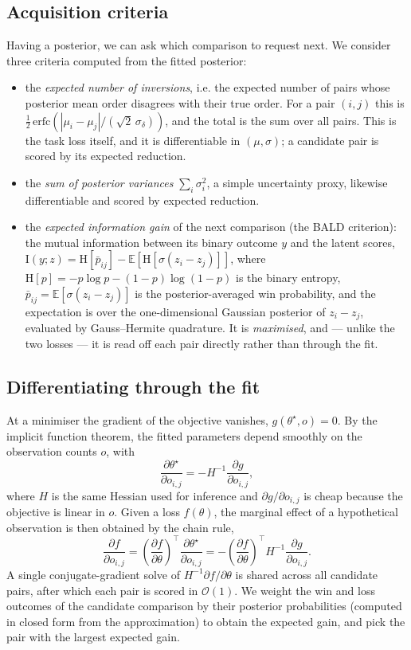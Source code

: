 \documentclass[12pt]{article}
\begin{document}
\subsection{Acquisition criteria}
Having a posterior, we can ask which comparison to request next. We consider three criteria computed
from the fitted posterior:
\begin{itemize}
    \item the \emph{expected number of inversions}, i.e. the expected number of pairs whose
          posterior mean order disagrees with their true order. For a pair $(i,j)$ this is
          $\tfrac{1}{2}\,\mathrm{erfc}\!\left(|\mu_i - \mu_j| / (\sqrt{2}\,\sigma_\delta)\right)$,
          and the total is the sum over all pairs. This is the task loss itself, and it is
          differentiable in $(\mu, \sigma)$; a candidate pair is scored by its expected reduction.
    \item the \emph{sum of posterior variances} $\sum_i \sigma_i^2$, a simple uncertainty proxy,
          likewise differentiable and scored by expected reduction.
    \item the \emph{expected information gain} of the next comparison (the BALD criterion): the mutual
          information between its binary outcome $y$ and the latent scores,
          $\mathrm{I}(y; z) = \mathrm{H}[\bar p_{ij}] - \mathbb{E}\!\left[\mathrm{H}[\sigma(z_i - z_j)]\right]$,
          where $\mathrm{H}[p] = -p\log p - (1-p)\log(1-p)$ is the binary entropy,
          $\bar p_{ij} = \mathbb{E}[\sigma(z_i - z_j)]$ is the posterior-averaged win probability, and the
          expectation is over the one-dimensional Gaussian posterior of $z_i - z_j$, evaluated by
          Gauss--Hermite quadrature. It is \emph{maximised}, and --- unlike the two losses --- it is
          read off each pair directly rather than through the fit.
\end{itemize}

\subsection{Differentiating through the fit}
At a minimiser the gradient of the objective vanishes, $g(\theta^\star, o) = 0$. By the
implicit function theorem, the fitted parameters depend smoothly on the observation counts $o$,
with
$$\frac{\partial \theta^\star}{\partial o_{i,j}} = - H^{-1} \frac{\partial g}{\partial o_{i,j}},$$
where $H$ is the same Hessian used for inference and $\partial g / \partial o_{i,j}$ is cheap
because the objective is linear in $o$. Given a loss $f(\theta)$, the marginal effect of a
hypothetical observation is then obtained by the chain rule,
$$\frac{\partial f}{\partial o_{i,j}} = \left(\frac{\partial f}{\partial \theta}\right)^{\!\top} \frac{\partial \theta^\star}{\partial o_{i,j}}
= - \left(\frac{\partial f}{\partial \theta}\right)^{\!\top} H^{-1} \frac{\partial g}{\partial o_{i,j}}.$$
A single conjugate-gradient solve of $H^{-1} \partial f / \partial \theta$ is shared across all
candidate pairs, after which each pair is scored in $\mathcal{O}(1)$. We weight the win and loss
outcomes of the candidate comparison by their posterior probabilities (computed in closed form
from the approximation) to obtain the expected gain, and pick the pair with the largest expected
gain.
\end{document}

